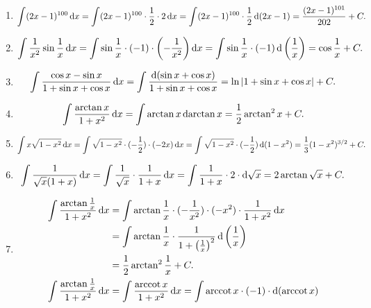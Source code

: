 \begin{solution}
    \begin{enumerate}
        \item $$\int (2x - 1)^{100} \operatorname{d\!} x = \int (2x-1)^{100} \cdot \frac{1}{2} \cdot 2 \operatorname{d\!} x = \int (2x-1)^{100} \cdot \frac{1}{2} \operatorname{d} (2x-1) = \frac{(2x-1)^{101}}{202} + C.$$
        \item $$\int \frac{1}{x^2} \sin \frac{1}{x} \operatorname{d\!} x = \int \sin \frac{1}{x} \cdot (-1) \cdot \left(-\frac{1}{x^2}\right) \operatorname{d\!} x = \int \sin \frac{1}{x} \cdot (-1) \operatorname{d} \left(\frac{1}{x}\right) = \cos \frac{1}{x} + C.$$
        \item $$\int \frac{\cos x - \sin x}{1 + \sin x + \cos x} \operatorname{d\!} x = \int \frac{\operatorname{d} (\sin x + \cos x)}{1 + \sin x + \cos x} = \ln |1 + \sin x + \cos x| + C.$$
        \item $$\int \frac{\arctan x}{1 + x^2} \operatorname{d\!} x = \int \arctan x \operatorname{d\!} \arctan x = \frac{1}{2} \arctan^2 x + C.$$
        \item $$\int x \sqrt{1 - x^2} \operatorname{d\!} x = \int \sqrt{1 - x^2} \cdot (-\frac{1}{2}) \cdot (-2x) \operatorname{d\!} x = \int \sqrt{1 - x^2} \cdot (-\frac{1}{2}) \operatorname{d} (1 - x^2) = \frac{1}{3} (1 - x^2)^{3/2} + C.$$
        \item $$\int \frac{1}{\sqrt{x}(1 + x)} \operatorname{d\!} x = \int \frac{1}{\sqrt{x}} \cdot \frac{1}{1 + x} \operatorname{d\!} x = \int \frac{1}{1 + x} \cdot 2 \cdot \operatorname{d\!} \sqrt{x} = 2 \arctan \sqrt{x} + C.$$
        \item \begin{align*}
                  \int \frac{\arctan \frac{1}{x}}{1 + x^2} \dif x & = \int \arctan \frac{1}{x} \cdot (-\frac{1}{x^2}) \cdot (-x^2) \cdot \frac{1}{1 + x^2} \dif x          \\
                                                                  & = \int \arctan \frac{1}{x} \cdot \frac{1}{1+\left(\frac{1}{x}\right)^2} \diff \left(\frac{1}{x}\right) \\
                                                                  & = \frac{1}{2} \arctan^2 \frac{1}{x} + C.                                                               \\
                  \int \frac{\arctan \frac{1}{x}}{1 + x^2} \dif x & = \int \frac{\arccot x}{1 + x^2} \dif x = \int \arccot x \cdot (-1) \cdot \diff (\arccot x)            \\

\end{align*}
\end{enumerate}
\end{solution}
